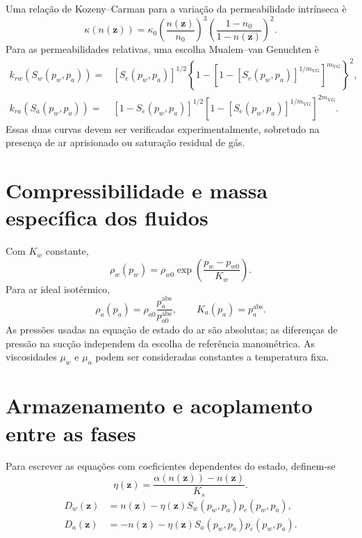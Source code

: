 \documentclass[11pt,a4paper]{article}
\begin{document}
Uma rela\c{c}\~ao de Kozeny--Carman para a varia\c{c}\~ao da
permeabilidade intr\'inseca \`e
\begin{equation*}
\boxed{\kappa(n(\mathbf z))=\kappa_0
\left(\frac{n(\mathbf z)}{n_0}\right)^3
\left(\frac{1-n_0}{1-n(\mathbf z)}\right)^2.}
\end{equation*}
Para as permeabilidades relativas, uma escolha Mualem--van Genuchten \`e
\begin{equation*}
\boxed{\begin{aligned}
k_{rw}(S_w(p_w,p_a))={}&[S_e(p_w,p_a)]^{1/2}
\left\{1-\left[1-[S_e(p_w,p_a)]^{1/m_{\mathrm{VG}}}\right]^{m_{\mathrm{VG}}}\right\}^{2},\\
k_{ra}(S_a(p_w,p_a))={}&[1-S_e(p_w,p_a)]^{1/2}
\left[1-[S_e(p_w,p_a)]^{1/m_{\mathrm{VG}}}\right]^{2m_{\mathrm{VG}}}.
\end{aligned}}
\end{equation*}
Essas duas curvas devem ser verificadas experimentalmente, sobretudo na
presen\c{c}a de ar aprisionado ou satura\c{c}\~ao residual de g\'as.

\section{Compressibilidade e massa espec\'ifica dos fluidos}\label{sec:fluidos}

Com $K_w$ constante,
\begin{equation*}
\boxed{\rho_w(p_w)=\rho_{w0}
\exp\left(\frac{p_w-p_{w0}}{K_w}\right).}
\end{equation*}
Para ar ideal isot\'ermico,
\begin{equation*}
\boxed{\rho_a(p_a)=\rho_{a0}\frac{p_a^{\mathrm{abs}}}{p_{a0}^{\mathrm{abs}}},
\qquad K_a(p_a)=p_a^{\mathrm{abs}}.}
\end{equation*}
As press\~oes usadas na equa\c{c}\~ao de estado do ar s\~ao absolutas;
as diferen\c{c}as de press\~ao na suc\c{c}\~ao independem da escolha de
refer\^encia manom\'etrica. As viscosidades $\mu_w$ e $\mu_a$ podem ser
consideradas constantes a temperatura fixa.

\section{Armazenamento e acoplamento entre as fases}

Para escrever as equa\c{c}\~oes com coeficientes dependentes do estado,
definem-se
\begin{equation*}
\boxed{\eta(\mathbf z)=\frac{\alpha(n(\mathbf z))-n(\mathbf z)}{K_s}.}
\end{equation*}
\begin{equation*}
\boxed{\begin{aligned}
D_w(\mathbf z)&=n(\mathbf z)-\eta(\mathbf z)S_w(p_w,p_a)p_c(p_w,p_a),\\
D_a(\mathbf z)&=-n(\mathbf z)-\eta(\mathbf z)S_a(p_w,p_a)p_c(p_w,p_a).
\end{aligned}}
\end{equation*}
\end{document}
